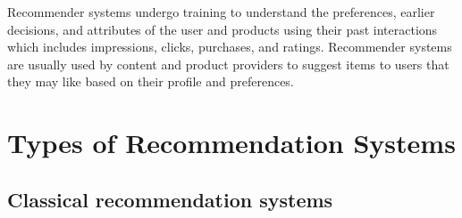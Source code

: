 Recommender systems undergo training to understand the preferences, earlier decisions, and attributes of the user and products using their past interactions which includes impressions, clicks, purchases, and ratings. Recommender systems are usually used by content and product providers to suggest items to users that they may like based on their profile and preferences. 

\section{Types of Recommendation Systems}\label{sec:types-of-recommendation-systems}
\subsection{Classical recommendation systems}\label{subsec:classical-recommendation-systems}
